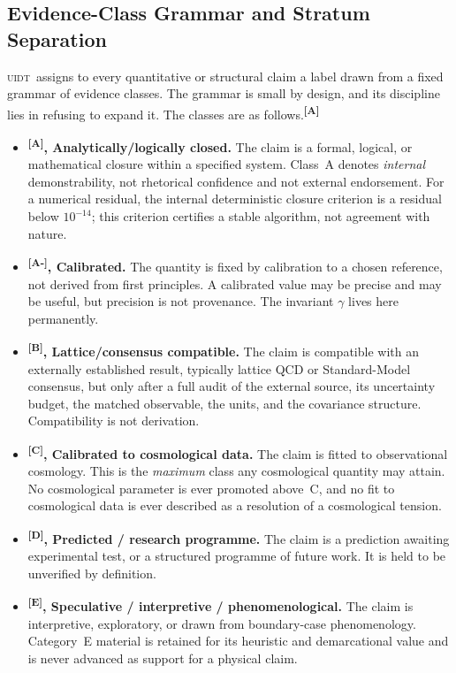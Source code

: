 \documentclass[12pt,a4paper,twoside]{article}
\theoremstyle{plain}
\theoremstyle{definition}
\theoremstyle{remark}
\newcommand{\UIDT}{\textsc{uidt}}
\newcommand{\catmark}[1]{\textsuperscript{\textsf{\textbf{[#1]}}}}
\begin{document}
\subsection{Evidence-Class Grammar and Stratum Separation}
\label{subsec:evidence-grammar}

\UIDT\ assigns to every quantitative or structural claim a label drawn from a fixed grammar of evidence classes. The grammar is small by design, and its discipline lies in refusing to expand it. The classes are as follows.\catmark{A}

\begin{itemize}[leftmargin=2.2em]
 \item \textbf{\catmark{A}, Analytically/logically closed.} The claim is a formal, logical, or mathematical closure within a specified system. Class~A denotes \emph{internal} demonstrability, not rhetorical confidence and not external endorsement. For a numerical residual, the internal deterministic closure criterion is a residual below $10^{-14}$; this criterion certifies a stable algorithm, not agreement with nature. \item \textbf{\catmark{A-}, Calibrated.} The quantity is fixed by calibration to a chosen reference, not derived from first principles. A calibrated value may be precise and may be useful, but precision is not provenance. The invariant $\gamma$ lives here permanently.

 \item \textbf{\catmark{B}, Lattice/consensus compatible.} The claim is compatible with an externally established result, typically lattice QCD or Standard-Model consensus, but only after a full audit of the external source, its uncertainty budget, the matched observable, the units, and the covariance structure. Compatibility is not derivation. \item \textbf{\catmark{C}, Calibrated to cosmological data.} The claim is fitted to observational cosmology. This is the \emph{maximum} class any cosmological quantity may attain. No cosmological parameter is ever promoted above~C, and no fit to cosmological data is ever described as a resolution of a cosmological tension. \item \textbf{\catmark{D}, Predicted / research programme.} The claim is a prediction awaiting experimental test, or a structured programme of future work. It is held to be unverified by definition. \item \textbf{\catmark{E}, Speculative / interpretive / phenomenological.} The claim is interpretive, exploratory, or drawn from boundary-case phenomenology. Category~E material is retained for its heuristic and demarcational value and is never advanced as support for a physical claim.
\end{itemize}
\end{document}
